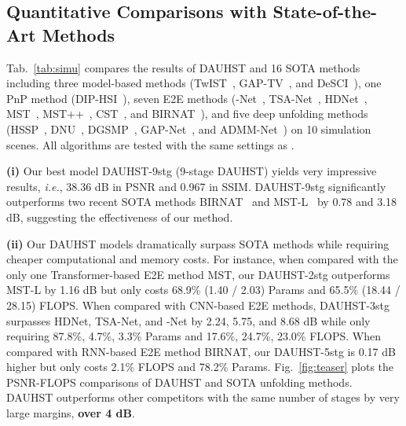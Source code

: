 \documentclass{article}
\begin{document}
\vspace{-1.5mm}
\subsection{Quantitative Comparisons with State-of-the-Art Methods}
\vspace{-1.5mm}

Tab.~\ref{tab:simu} compares the results of DAUHST and 16 SOTA methods including three model-based methods (TwIST~\cite{twist}, GAP-TV~\cite{gap_tv}, and DeSCI~\cite{desci}), one PnP method (DIP-HSI~\cite{self}), seven E2E methods (-Net~\cite{lambda}, TSA-Net~\cite{tsa_net}, HDNet~\cite{hdnet}, MST~\cite{mst}, MST++~\cite{mst_pp}, CST~\cite{cst}, and BIRNAT~\cite{birnat}), and five deep unfolding methods (HSSP~\cite{hssp}, DNU~\cite{dnu}, DGSMP~\cite{gsm}, GAP-Net~\cite{gapnet}, and ADMM-Net~\cite{admm-net}) on 10 simulation scenes. All algorithms are tested with the same settings as \cite{gsm,mst}.

\textbf{(i)} Our best model DAUHST-9stg (9-stage DAUHST) yields very impressive results, \emph{i.e.}, 38.36 dB in PSNR and 0.967 in SSIM. DAUHST-9stg significantly outperforms two recent SOTA methods BIRNAT~\cite{birnat} and MST-L~\cite{mst} by 0.78 and 3.18 dB, suggesting the effectiveness of our method.  

\textbf{(ii)} Our DAUHST models dramatically surpass SOTA methods while requiring cheaper computational and memory costs. For instance, when compared with the only one Transformer-based E2E method MST, our DAUHST-2stg outperforms MST-L by 1.16 dB but only costs 68.9\% (1.40 / 2.03) Params and 65.5\% (18.44 / 28.15) FLOPS.  When compared with CNN-based E2E methods,  DAUHST-3stg  surpasses HDNet, TSA-Net, and -Net by 2.24, 5.75, and 8.68 dB while only requiring 87.8\%, 4.7\%, 3.3\% Params and 17.6\%, 24.7\%, 23.0\% FLOPS. When compared with RNN-based E2E method BIRNAT, our DAUHST-5stg is 0.17 dB higher but only costs  2.1\% FLOPS and 78.2\% Params. Fig.~\ref{fig:teaser}  plots the PSNR-FLOPS comparisons of DAUHST and SOTA unfolding methods.  DAUHST  outperforms other competitors with the same number of stages  by very large margins, \textbf{over 4 dB}.  


\vspace{-1.5mm}
\end{document}
